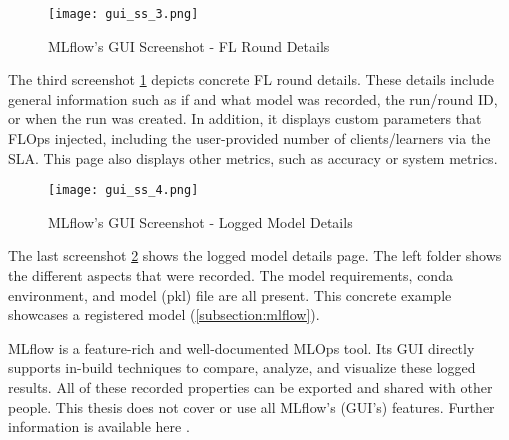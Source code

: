 \begin{figure}[p]
    \centering
    \texttt{[image: gui\_ss\_3.png]}
    \caption{MLflow's GUI Screenshot - FL Round Details}
    \label{fig:gui_ss_3}
\end{figure}

The third screenshot \ref{fig:gui_ss_3} depicts concrete FL round details.
These details include general information such as if and what model was recorded, the run/round ID, or when the run was created.
In addition, it displays custom parameters that FLOps injected, including the user-provided number of clients/learners via the SLA.
This page also displays other metrics, such as accuracy or system metrics.

\begin{figure}[p]
    \begin{adjustwidth}{-0.1\paperwidth}{-0.1\paperwidth}
        \centering
        \texttt{[image: gui\_ss\_4.png]}
        \caption{MLflow's GUI Screenshot - Logged Model Details}
        \label{fig:gui_ss_4}
    \end{adjustwidth}
\end{figure}

The last screenshot \ref{fig:gui_ss_4} shows the logged model details page.
The left folder shows the different aspects that were recorded.
The model requirements, conda environment, and model (pkl) file are all present.
This concrete example showcases a registered model (\ref{subsection:mlflow}).

MLflow is a feature-rich and well-documented MLOps tool.
Its GUI directly supports in-build techniques to compare, analyze, and visualize these logged results.
All of these recorded properties can be exported and shared with other people.
This thesis does not cover or use all MLflow's (GUI's) features.
Further information is available here \cite{mlflow:homepage,mlflow:docs}.